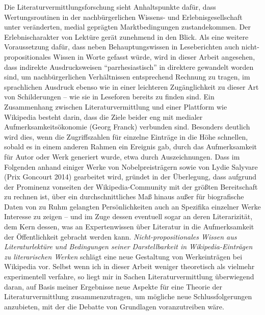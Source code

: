 \documentclass[fontsize=12pt]{scrartcl}
\begin{document}
Die Li\-te\-ra\-tur\-ver\-mitt\-lungsfor\-schung sieht Anhaltspunkte daf\"ur, dass Wertungsroutinen in der nachb\"urgerlichen Wissens- und Erlebnisge\-sell\-schaft unter ver\"anderten, medial gepr\"agten Marktbedingungen zustandekommen. Der Erlebnischarakter von Lekt\"ure ger\"at zunehmend in den Blick. Als eine weitere Voraussetzung daf\"ur, dass neben Behauptungswissen in Leseberichten auch nicht-pro\-po\-si\-ti\-o\-na\-les Wissen in Worte gefasst w\"urde, wird in dieser Arbeit angesehen, dass indirekte Aus\-drucks\-weisen "`parrhesiastisch"' in direktere gewandelt worden sind, um nachb\"urgerlichen Verh\"altnissen entsprechend Rechnung zu tragen, im sprachlichen Ausdruck ebenso wie in einer leichteren Zug\"ang\-lichkeit zu dieser Art von Schil\-derungen -- wie sie in Leseforen bereits zu finden sind. Ein Zusammenhang zwischen Li\-te\-ra\-tur\-ver\-mitt\-lung und einer Plattform wie Wi\-ki\-pe\-dia be\-steht darin, dass die Ziele beider eng mit medialer Aufmerksamkeits\"okonomie (Georg Franck) verbunden sind. Besonders deutlich wird dies, wenn die Zugriffszahlen f\"ur einzelne Eintr\"age in die H\"ohe schnellen, sobald es in einem anderen Rahmen ein Ereignis gab, durch das Aufmerksamkeit f\"ur Autor\textsuperscript{\tiny *} oder Werk generiert wurde, etwa durch Auszeichnungen. Dass im Folgenden anhand einiger Werke von Nobelpreistr\"agern\textsuperscript{\tiny *} sowie von Lydie Salyvare (Prix Goncourt 2014) gearbeitet wird, gr\"undet in der \"Uberlegung, dass aufgrund der Prominenz vonseiten der Wi\-ki\-pe\-dia-Community mit der gr\"o{\ss}ten Bereitschaft zu rechnen ist, \"uber ein durchschnittliches Ma{\ss} hinaus au{\ss}er f\"ur biografische Daten von zu Ruhm gelangten Pers\"onlichkeiten auch an Spezifika einzelner Werke Interesse zu zeigen -- und im Zuge dessen eventuell sogar an deren Literarizit\"at, dem Kern dessen, was an Experten\textsuperscript{\tiny *}wissen \"uber Li\-te\-ra\-tur in die Aufmerksamkeit der \"Of\-fent\-lichkeit gebracht werden kann. \textit{Nicht-pro\-po\-si\-ti\-o\-na\-les Wissen aus Li\-te\-ra\-tur\-lekt\"ure und Bedingungen seiner Darstellbarkeit in Wi\-ki\-pe\-dia-Eintr\"agen zu li\-te\-ra\-rischen Werken} schl\"agt eine neue Gestaltung von Werkeintr\"agen bei Wi\-ki\-pe\-dia vor. \mbox{Selbst} wenn ich in dieser Arbeit weniger theo\-retisch als vielmehr experimentell verfahre, so liegt mir in Sachen Li\-te\-ra\-tur\-ver\-mitt\-lung \"uberwiegend daran, auf Basis meiner Ergebnisse neue Aspekte f\"ur eine Theorie der Li\-te\-ra\-tur\-ver\-mitt\-lung zusammenzutragen, um m\"ogliche neue Schlussfolgerungen anzubieten, mit der die Debatte von Grundlagen voranzutreiben w\"are.
\end{document}
